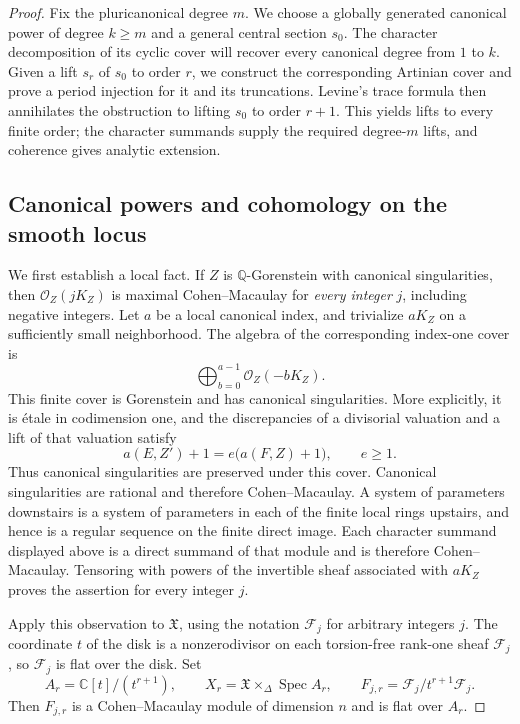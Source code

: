 \documentclass[11pt,a4paper]{article}
\theoremstyle{definition}\newtheorem{definition}[theorem]{Definition}
\theoremstyle{remark}\newtheorem*{remark}{Remark}
\newcommand{\Q}{\mathbb Q}\newcommand{\C}{\mathbb C}
\newcommand{\OO}{\mathcal O}
\newcommand{\cF}{\mathcal F}\newcommand{\cX}{\mathcal X}
\newcommand{\Spec}{\operatorname{Spec}}\newcommand{\Proj}{\operatorname{Proj}}
\begin{document}
\begin{proof}
Fix the pluricanonical degree $m$.
We choose a globally generated canonical power of degree $k\ge m$
and a general central section $s_0$. The character decomposition of
its cyclic cover will recover every canonical degree from $1$ to $k$.
Given a lift $s_r$ of $s_0$ to order $r$, we construct the corresponding
Artinian cover and prove a period injection for it and its truncations.
Levine's trace formula then annihilates the obstruction to lifting
$s_0$ to order $r+1$. This yields lifts to every finite order;
the character summands supply the required degree-$m$ lifts, and
coherence gives analytic extension.

\subsection{Canonical powers and cohomology on the smooth locus}

We first establish a local fact. If $Z$ is $\Q$-Gorenstein with canonical
singularities, then $\OO_Z(jK_Z)$ is maximal Cohen--Macaulay for
\emph{every integer} $j$, including negative integers.
Let $a$ be a local canonical index, and trivialize $aK_Z$ on a sufficiently
small neighborhood. The algebra of the corresponding index-one cover is
\[
 \bigoplus_{b=0}^{a-1}\OO_Z(-bK_Z).
\]
This finite cover is Gorenstein and has canonical singularities. More
explicitly, it is étale in codimension one, and the discrepancies of a
divisorial valuation and a lift of that valuation satisfy
\[
 a(E,Z')+1=e\bigl(a(F,Z)+1\bigr),\qquad e\ge1.
\]
Thus canonical singularities are preserved under this cover.
Canonical singularities are rational and therefore Cohen--Macaulay.
A system of parameters downstairs is a system of parameters in each of the
finite local rings upstairs, and hence is a regular sequence on the finite
direct image. Each character summand displayed above is a direct summand of
that module and is therefore Cohen--Macaulay. Tensoring with powers of the
invertible sheaf associated with $aK_Z$ proves the assertion for every
integer $j$.

Apply this observation to $\mathfrak X$, using the notation $\cF_j$ for
arbitrary integers $j$. The coordinate $t$ of the disk is a nonzerodivisor
on each torsion-free rank-one sheaf $\cF_j$, so $\cF_j$ is flat over the disk.
Set
\[
 A_r=\C[t]/(t^{r+1}),\qquad
 X_r=\mathfrak X\times_\Delta\Spec A_r,\qquad
 F_{j,r}=\cF_j/t^{r+1}\cF_j.
\]
Then $F_{j,r}$ is a Cohen--Macaulay module of dimension $n$ and is flat over
$A_r$.


\end{proof}
\end{document}
